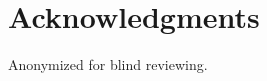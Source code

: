 \documentclass{sigchi}
\begin{document}













\section{Acknowledgments}

Anonymized for blind reviewing.

\balance



\end{document}
